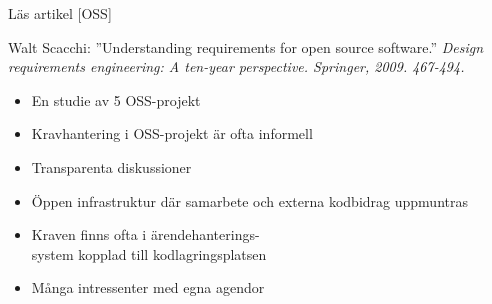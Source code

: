 \documentclass{simpleslides}
\begin{document}
\begin{Slide}{Läs artikel [OSS]}

{\small
Walt Scacchi: ''Understanding requirements for open source software.'' \textit{Design requirements engineering: A ten-year perspective. Springer, 2009. 467-494. }}
\begin{itemize}
  \item En studie av 5 OSS-projekt
  \item Kravhantering i OSS-projekt är ofta informell
  \item Transparenta diskussioner
  \item Öppen infrastruktur där samarbete och externa kodbidrag uppmuntras
  \item Kraven finns ofta i ärendehanterings-\\system kopplad till kodlagringsplatsen
  \item Många intressenter med egna agendor
\end{itemize}  

\end{Slide}






\end{document}
